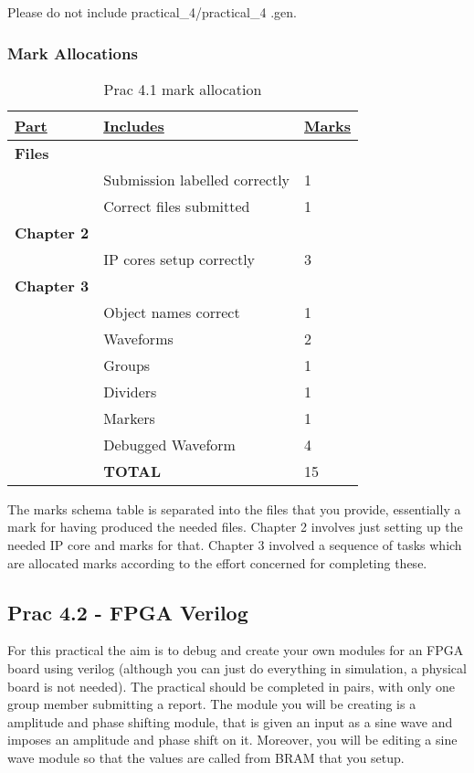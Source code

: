 Please do not include practical\_4/practical\_4 .gen.

\subsubsection{Mark Allocations}
\begin{table}[H]
\centering
\caption{Prac 4.1 mark allocation}
\label{tbl:Prac4-Marks}
\begin{tabular}{|l|l|l|}
\hline
{\ul \textbf{Part}} & {\ul \textbf{Includes}} & {\ul \textbf{Marks}} \\ \hline
\textbf{Files} &  &  \\ \hline
 & Submission labelled correctly &  1\\ \hline
 & Correct files submitted &  1\\ \hline
\textbf{Chapter 2} &  &  \\ \hline
 & IP cores setup correctly & 3 \\  \hline
\textbf{Chapter 3} &  &  \\ \hline
 & Object names correct & 1 \\ \hline
 & Waveforms & 2 \\ \hline
 & Groups & 1 \\ \hline
 & Dividers & 1 \\ \hline
 & Markers & 1 \\ \hline
 & Debugged Waveform & 4 \\ \hline
 & \textbf{TOTAL} & 15 \\ \hline
\end{tabular}%
\end{table}

The marks schema table is separated into the files that you provide, essentially a mark for having produced the needed files. Chapter 2 involves just setting up the needed IP core and marks for that. Chapter 3 involved a sequence of tasks which are allocated marks according to the effort concerned for completing these.

\newpage

\subsection{Prac 4.2 - FPGA Verilog}
For this practical the aim is to debug and create your own modules for an FPGA board using verilog (although you can just do everything in simulation, a physical board is not needed). The practical should be completed in pairs, with only one group member submitting a report. The module you will be creating is a amplitude and phase shifting module, that is given an input as a sine wave and imposes an amplitude and phase shift on it. Moreover, you will be editing a sine wave module so that the values are called from BRAM that you setup.

